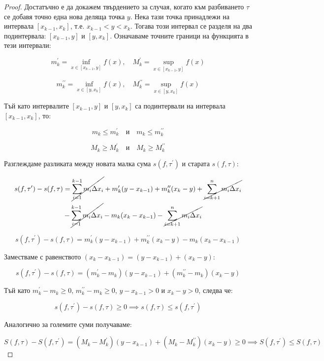 \documentclass{scrartcl}
\begin{document}
\begin{FlushLeft}
\begin{proof}
Достатъчно е да докажем твърдението за случая, когато към разбиването $\tau$ се добавя точно една нова деляща точка $y$. Нека тази точка принадлежи на интервала $[x_{k-1}, x_k]$, т.е. $x_{k-1} < y < x_k$. Тогава този интервал се разделя на два подинтервала: $[x_{k-1}, y]$ и $[y, x_k]$. Означаваме точните граници на функцията в тези интервали:

\[ m_k^{\prime} = \inf_{x \in [x_{k-1}, y]} f(x), \quad M_k^{\prime} = \sup_{x \in [x_{k-1}, y]} f(x) \]

\[ m_k^{\prime\prime} = \inf_{x \in [y, x_k]} f(x), \quad M_k^{\prime\prime} = \sup_{x \in [y, x_k]} f(x) \]

Тъй като интервалите $[x_{k-1}, y]$ и $[y, x_k]$ са подинтервали на интервала $[x_{k-1}, x_k]$, то:

\[ m_k \le m_k^{\prime} \quad \text{и} \quad m_k \le m_k^{\prime\prime} \]

\[ M_k \ge M_k^{\prime} \quad \text{и} \quad M_k \ge M_k^{\prime\prime} \]

Разглеждаме разликата между новата малка сума $s(f, \tau^{\prime})$ и старата $s(f, \tau)$:

\begin{align*}
s(f, \tau^{\prime}) - s(f, \tau) & = \cancel{\sum_{i=1}^{k-1}m_i\Delta  x_i} + m_k'(y - x_{k-1}) + m_k'' (x_k - y) + \cancel{\sum_{i=k+1}^{n} m_i\Delta  x_i} \\& - \cancel{\sum_{i=1}^{k-1}m_i\Delta  x_i} - m_k(x_k - x_{k-1}) - \cancel{\sum_{i=k+1}^{n} m_i\Delta  x_i}
\end{align*}

\[ s(f, \tau^{\prime}) - s(f, \tau) = m_k^{\prime}(y - x_{k-1}) + m_k^{\prime\prime}(x_k - y) - m_k(x_k - x_{k-1}) \]

Заместваме с равенството $(x_k - x_{k-1}) = (y - x_{k-1}) + (x_k - y)$:

\[ s(f, \tau^{\prime}) - s(f, \tau) = (m_k^{\prime} - m_k)(y - x_{k-1}) + (m_k^{\prime\prime} - m_k)(x_k - y) \]

Тъй като $m_k^{\prime} - m_k \ge 0$, $m_k^{\prime\prime} - m_k \ge 0$, $y - x_{k-1} > 0$ и $x_k - y > 0$, следва че:

\[ s(f, \tau^{\prime}) - s(f, \tau) \ge 0 \implies s(f, \tau) \le s(f, \tau^{\prime}) \]

Аналогично за големите суми получаваме:

\[ S(f, \tau) - S(f, \tau^{\prime}) = (M_k - M_k^{\prime})(y - x_{k-1}) + (M_k - M_k^{\prime\prime})(x_k - y) \ge 0 \implies S(f, \tau^{\prime}) \le S(f, \tau) \]


\end{proof}
\end{FlushLeft}
\end{document}
